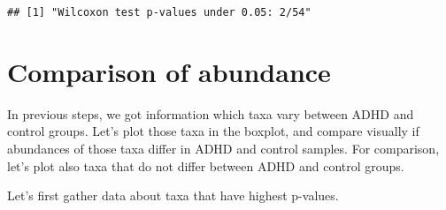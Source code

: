\documentclass[
  oneside]{book}
\begin{document}
\begin{verbatim}
## [1] "Wilcoxon test p-values under 0.05: 2/54"
\end{verbatim}

\hypertarget{comparison-of-abundance}{%
\section{Comparison of abundance}\label{comparison-of-abundance}}

In previous steps, we got information which taxa vary between ADHD and control groups.
Let's plot those taxa in the boxplot, and compare visually if abundances of those taxa
differ in ADHD and control samples. For comparison, let's plot also taxa that do not
differ between ADHD and control groups.

Let's first gather data about taxa that have highest p-values.
\end{document}
